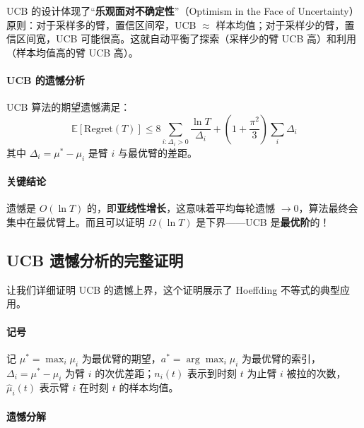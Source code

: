UCB 的设计体现了“\textbf{乐观面对不确定性}”（Optimism in the Face of Uncertainty）原则：对于采样多的臂，置信区间窄，UCB $\approx$ 样本均值；对于采样少的臂，置信区间宽，UCB 可能很高。这就自动平衡了探索（采样少的臂 UCB 高）和利用（样本均值高的臂 UCB 高）。

\paragraph{UCB 的遗憾分析}\mbox{}\par\nopagebreak

\begin{theorem}
UCB 算法的期望遗憾满足：
\begin{equation}
    \mathbb{E}[\text{Regret}(T)] \leq 8 \sum_{i: \Delta_i > 0} \frac{\ln T}{\Delta_i} + \left(1 + \frac{\pi^2}{3}\right) \sum_i \Delta_i
\end{equation}
其中 $\Delta_i = \mu^* - \mu_i$ 是臂 $i$ 与最优臂的差距。
\end{theorem}

\paragraph{关键结论}
遗憾是 $O(\ln T)$ 的，即\textbf{亚线性增长}，这意味着平均每轮遗憾 $\to 0$，算法最终会集中在最优臂上。而且可以证明 $\Omega(\ln T)$ 是下界——UCB 是\textbf{最优阶}的！

\subsection{UCB 遗憾分析的完整证明}

让我们详细证明 UCB 的遗憾上界，这个证明展示了 Hoeffding 不等式的典型应用。

\paragraph{记号}
记 $\mu^* = \max_i \mu_i$ 为最优臂的期望，$a^* = \arg\max_i \mu_i$ 为最优臂的索引，$\Delta_i = \mu^* - \mu_i$ 为臂 $i$ 的次优差距；$n_i(t)$ 表示到时刻 $t$ 为止臂 $i$ 被拉的次数，$\hat{\mu}_i(t)$ 表示臂 $i$ 在时刻 $t$ 的样本均值。

\paragraph{遗憾分解}

